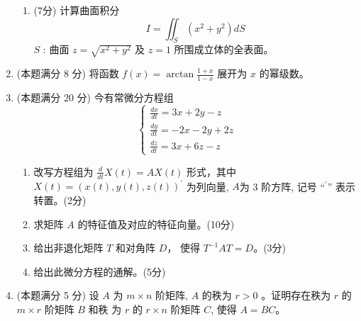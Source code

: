 \begin{enumerate}
\begin{enumerate}
	
	\item
	(7分)
	计算曲面积分
	\[
	I=\iint_{S}\left(x^{2}+y^{2}\right) d S
	\]
	$S$ : 曲面 $z=\sqrt{x^{2}+y^{2}}$ 及 $z=1$ 所围成立体的全表面。
	
	
	
	
\end{enumerate}

\banswer{
	
}



\item 
(本题满分 8 分)
将函数 $f(x)=\arctan \frac{1+x}{1-x}$ 展开为 $x$ 的幂级数。

\banswer{
	
}



\newpage

\item 
(本题满分 20 分)
今有常微分方程组
\[
\left\{\begin{array}{l}
	\frac{d x}{d t}=3 x+2 y-z \\
	\frac{d y}{d t}=-2 x-2 y+2 z \\
	\frac{d z}{d t}=3 x+6 z-z
\end{array}\right.
\]	
\begin{enumerate}
	\item
改写方程组为 $\frac{d}{d t} X(t)=A X(t)$ 形式，其中 $X(t)=(x(t), y(t), z(t))^{\prime}$ 为列向量, $A$为 3 阶方阵, 记号 “$  {}^{\prime}  $” 表示转置。(2分)
	
	
	\item
	求矩阵 $A$ 的特征值及对应的特征向量。(10分)
	
	
	\item
	给出非退化矩阵 $T$ 和对角阵 $D ，$ 使得 $T^{-1} A T=D$。(3分)
	
	
	\item
	给出此微分方程的通解。(5分)
	
	
	
	
\end{enumerate}


\banswer{
	
}



\item 
(本题满分 5 分)
设 $A$ 为 $m \times n$ 阶矩阵, $A$ 的秩为 $r>0$ 。证明存在秩为 $r$ 的 $m \times r$ 阶矩阵 $B$ 和秩 为 $r$ 的 $r \times n$ 阶矩阵 $C$, 使得 $A=B C$。


\end{enumerate}
